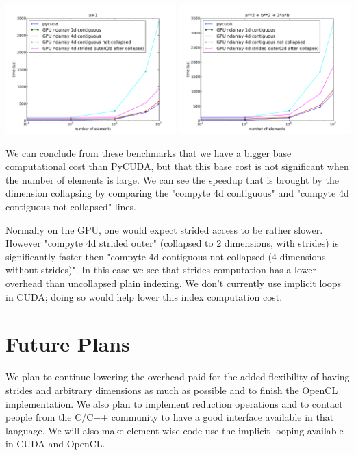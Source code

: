 \documentclass{article} %
\begin{document}
\includegraphics[width=0.495\textwidth]{ap1_no_alloc}
\includegraphics[width=0.495\textwidth]{a2pb2p2ab_no_alloc}

We can conclude from these benchmarks that we have a bigger base computational cost than PyCUDA, but that this base cost is not significant when the number of elements is large.
We can see the speedup that is brought by the dimension collapsing by comparing the "compyte 4d contiguous" and "compyte 4d contiguous not collapsed" lines.

Normally on the GPU, one would expect strided access to be rather slower.
However "compyte 4d strided outer" (collapsed to 2 dimensions, with strides) is significantly faster then "compyte 4d contiguous not collapsed (4 dimensions without strides)".
In this case we see that strides computation has a lower overhead than uncollapsed plain indexing.
We don't currently use implicit loops in CUDA; doing so would help lower this index computation cost.

\section{Future Plans}

We plan to continue lowering the overhead paid for the added flexibility of having strides and arbitrary dimensions 
as much as possible and to finish the OpenCL implementation.
We also plan to implement reduction operations and to contact people from the C/C++ community to have a good interface available in that language.
We will also make element-wise code use the implicit looping available in CUDA and OpenCL.
\end{document}
